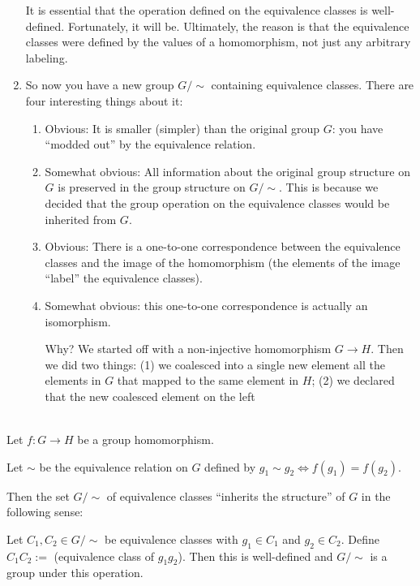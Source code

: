 \begin{enumerate}
It is essential that the operation defined on the equivalence classes is well-defined. Fortunately,
it will be. Ultimately, the reason is that the equivalence classes were defined by the values of a
homomorphism, not just any arbitrary labeling.
\item So now you have a new group $G/{\sim}$ containing equivalence classes. There are four
  interesting things about it:
  \begin{enumerate}
  \item Obvious: It is smaller (simpler) than the original group $G$: you have ``modded out'' by
    the equivalence relation.
  \item Somewhat obvious: All information about the original group structure on $G$ is preserved in
    the group structure on $G/{\sim}$. This is because we decided that the group operation on the
    equivalence classes would be inherited from $G$.
  \item Obvious: There is a one-to-one correspondence between the equivalence classes and the image
    of the homomorphism (the elements of the image ``label'' the equivalence classes).
  \item Somewhat obvious: this one-to-one correspondence is actually an isomorphism.

    Why? We started off with a non-injective homomorphism $G \to H$. Then we did two things: (1) we
    coalesced into a single new element all the elements in $G$ that mapped to the same element in
    $H$; (2) we declared that the new coalesced element on the left
  \end{enumerate}
\end{enumerate}

\newpage
\begin{theorem}~\\
  Let $f:G \to H$ be a group homomorphism.

  Let $\sim$ be the equivalence relation on $G$ defined by $g_1 \sim g_2 \iff f(g_1) = f(g_2)$.

  Then the set $G/{\sim}$ of equivalence classes ``inherits the structure'' of $G$ in the following
  sense:

  Let $C_1, C_2 \in G/{\sim}$ be equivalence classes with $g_1 \in C_1$ and $g_2 \in C_2$. Define
  $C_1C_2 := $ (equivalence class of $g_1g_2$). Then this is well-defined and $G/{\sim}$ is a group
  under this operation.

\end{theorem}

